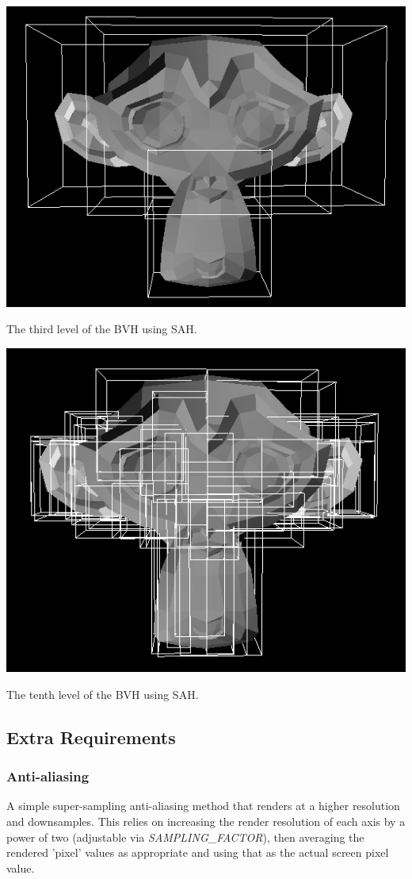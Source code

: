 \documentclass{article}
\begin{document}
\begin{center}
        \includegraphics[scale=0.75]{images/bvh_level_three.png}

        The third level of the BVH using SAH.

        \includegraphics[scale=0.75]{images/bvh_level_ten.png}

        The tenth level of the BVH using SAH.
    \end{center}

    \subsection{Extra Requirements}
    \subsubsection{Anti-aliasing}
    A simple super-sampling anti-aliasing method that renders at a higher resolution and downsamples.
    This relies on increasing the render resolution of each axis by a power of two (adjustable via \emph{SAMPLING\_FACTOR}),
    then averaging the rendered 'pixel' values as appropriate and using that as the actual screen pixel value.
\end{document}

